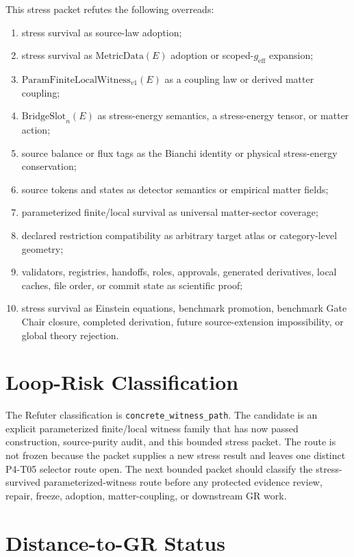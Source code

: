 \documentclass[11pt]{article}
\newcommand{\MetricData}{\mathrm{MetricData}}
\newcommand{\geff}{g_{\mathrm{eff}}}
\newcommand{\PFLFW}{\mathrm{ParamFiniteLocalWitness}_{v1}}
\newcommand{\BridgeSlot}{\mathrm{BridgeSlot}}
\begin{document}
This stress packet refutes the following overreads:
\begin{enumerate}[leftmargin=*]
  \item stress survival as source-law adoption;
  \item stress survival as \(\MetricData(E)\) adoption or scoped-\(\geff\)
  expansion;
  \item \(\PFLFW(E)\) as a coupling law or derived matter coupling;
  \item \(\BridgeSlot_n(E)\) as stress-energy semantics, a stress-energy
  tensor, or matter action;
  \item source balance or flux tags as the Bianchi identity or physical
  stress-energy conservation;
  \item source tokens and states as detector semantics or empirical matter
  fields;
  \item parameterized finite/local survival as universal matter-sector
  coverage;
  \item declared restriction compatibility as arbitrary target atlas or
  category-level geometry;
  \item validators, registries, handoffs, roles, approvals, generated
  derivatives, local caches, file order, or commit state as scientific proof;
  \item stress survival as Einstein equations, benchmark promotion, benchmark
  Gate Chair closure, completed derivation, future source-extension
  impossibility, or global theory rejection.
\end{enumerate}

\section{Loop-Risk Classification}

The Refuter classification is \texttt{concrete\_witness\_path}. The candidate
is an explicit parameterized finite/local witness family that has now passed
construction, source-purity audit, and this bounded stress packet. The route is
not frozen because the packet supplies a new stress result and leaves one
distinct P4-T05 selector route open. The next bounded packet should classify
the stress-survived parameterized-witness route before any protected evidence
review, repair, freeze, adoption, matter-coupling, or downstream GR work.

\section{Distance-to-GR Status}
\end{document}
